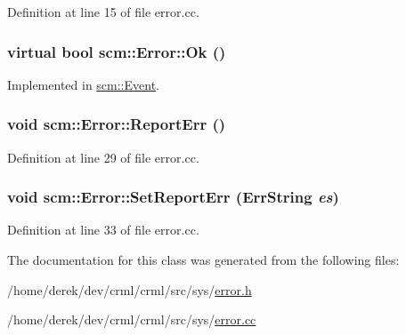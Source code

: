 Definition at line 15 of file error.cc.

\hypertarget{classscm_1_1_error_a2660b73f9671be3f286bed9d622a926a}{
\subsubsection[{Ok}]{\setlength{\rightskip}{0pt plus 5cm}virtual bool scm::Error::Ok ()}}
\label{classscm_1_1_error_a2660b73f9671be3f286bed9d622a926a}


Implemented in \hyperlink{classscm_1_1_event_a95400a0d0218dfb664c028d1130a5d14}{scm::Event}.

\hypertarget{classscm_1_1_error_a4dc4a630569665a615a0bfb321b65238}{
\subsubsection[{ReportErr}]{\setlength{\rightskip}{0pt plus 5cm}void scm::Error::ReportErr ()}}
\label{classscm_1_1_error_a4dc4a630569665a615a0bfb321b65238}


Definition at line 29 of file error.cc.

\hypertarget{classscm_1_1_error_ace08c93643469a92cb3ca1e0fb1ca583}{
\subsubsection[{SetReportErr}]{\setlength{\rightskip}{0pt plus 5cm}void scm::Error::SetReportErr ({\bf ErrString} {\em es})}}
\label{classscm_1_1_error_ace08c93643469a92cb3ca1e0fb1ca583}


Definition at line 33 of file error.cc.



The documentation for this class was generated from the following files:\begin{DoxyCompactItemize}
\item 
/home/derek/dev/crml/crml/src/sys/\hyperlink{error_8h}{error.h}\item 
/home/derek/dev/crml/crml/src/sys/\hyperlink{error_8cc}{error.cc}\end{DoxyCompactItemize}
